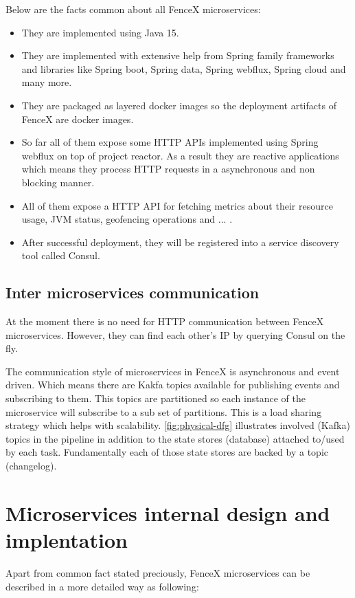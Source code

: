 \documentclass[a4]{report}
\begin{document}
    Below are the facts common about all FenceX microservices:
    \begin{itemize}
        \item They are implemented using Java 15.
        \item They are implemented with extensive help from Spring family frameworks and libraries like Spring boot, Spring data, Spring webflux, Spring cloud and many more.
        \item They are packaged as layered docker images so the deployment artifacts of FenceX are docker images.
        \item So far all of them expose some HTTP APIs implemented using Spring webflux on top of project reactor. As a result they are reactive applications which means they process HTTP requests in a asynchronous and non blocking manner.
        \item All of them expose a HTTP API for fetching metrics about their resource usage, JVM status, geofencing operations and ... .
        \item After successful deployment, they will be registered into a service discovery tool called Consul.
    \end{itemize}

    \subsection{Inter microservices communication}
    At the moment there is no need for HTTP communication between FenceX microservices.
    However, they can find each other's IP by querying Consul on the fly.

    The communication style of microservices in FenceX is asynchronous and event driven.
    Which means there are Kakfa topics available for publishing events and subscribing to them.
    This topics are partitioned so each instance of the microservice will subscribe to a sub set of partitions.
    This is a load sharing strategy which helps with scalability.
    \ref{fig:physical-dfg} illustrates involved (Kafka) topics in the pipeline in addition to the state stores (database)
    attached to/used by each task.
    Fundamentally each of those state stores are backed by a topic (changelog).


    \section{Microservices internal design and implentation}
    Apart from common fact stated preciously, FenceX microservices can be described in a more detailed way as following:
\end{document}
